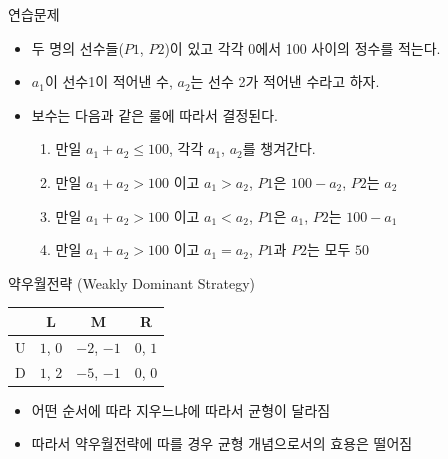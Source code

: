 \documentclass[final]{beamer}
\begin{document}
\begin{frame}[t]{연습문제}
	\begin{itemize}
	\item 두 명의 선수들($P1$, $P2$)이 있고 각각 0에서 100 사이의 정수를 적는다. 
	\item $a_1$이 선수1이 적어낸 수, $a_2$는 선수 2가 적어낸 수라고 하자. 
	\item 보수는 다음과 같은 룰에 따라서 결정된다. 
		\begin{enumerate}
		\item 만일 $a_1 + a_2 \leq 100$, 각각 $a_1$, $a_2$를 챙겨간다.
		\item 만일 $a_1 + a_2 > 100$ 이고 $a_1 > a_2$, $P1$은 $100-a_2$, $P2$는 $a_2$
		\item 만일 $a_1 + a_2 > 100$ 이고 $a_1 < a_2$, $P1$은 $a_1$, $P2$는 $100-a_1$
		\item 만일 $a_1 + a_2 > 100$ 이고 $a_1 = a_2$, $P1$과 $P2$는 모두 $50$
		\end{enumerate}
	\end{itemize}
	\begin{center}
	\end{center}
\end{frame}

\begin{frame}[t]{약우월전략 (Weakly Dominant Strategy)}
	\begin{center}
	\begin{table}
	\setlength{\tabcolsep}{1.2em}
	\begin{tabular}{|c|c|c|c|} \hline
	& {L} &  {M} & {R}\\ \hline
	{U} & {$1$}, {$0$} & {$-2$}, {$-1$} & {$0$}, {$1$} \\ \hline%
	{D} & {$1$}, {$2$}  & {$-5$}, {$-1$} & {$0$}, {$0$} \\ 
	\hline
	\end{tabular}
	\end{table}
	\end{center}
	\vspace{1em}
	\begin{itemize}
		\item 어떤 순서에 따라 지우느냐에 따라서 균형이 달라짐
		\item 따라서 약우월전략에 따를 경우 균형 개념으로서의 효용은 떨어짐
	\end{itemize}
\end{frame}

\end{document}
